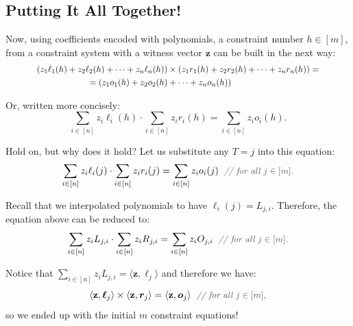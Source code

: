 \documentclass[../../book.tex]{subfiles}
\begin{document}
\subsection{Putting It All Together!}

Now, using coefficients encoded with polynomials, a constraint number $h \in
[m]$, from a constraint system with a witness vector $\mathbf{z}$ can be built
in the next way:
\begin{equation*} 
    \scalebox{0.9}{$
    \begin{aligned}
        (z_1\ell_1(h) + z_2\ell_2(h) + \dots + z_n\ell_n(h)) &\times (z_1r_1(h) + z_2r_2(h) + \dots + z_nr_n(h)) =\\ = (z_1o_1(h) + z_2o_2(h)& + \dots + z_no_n(h))
    \end{aligned}
    $}
\end{equation*}

Or, written more concisely:
\begin{equation*}
    \sum_{i \in [n]} z_i\ell_i(h) \cdot \sum_{i \in [n]} z_ir_i(h) = \sum_{i \in [n]} z_io_i(h).
\end{equation*}

\begin{remark}
    Hold on, but why does it hold? Let us substitute any $T=j$ into this equation:
    \begin{equation*}
        \sum_{i \in [n]} z_i\ell_i(j) \cdot \sum_{i \in [n]} z_ir_i(j) = \sum_{i \in [n]} z_io_i(j) \; \commentgray{for all $j \in [m]$.}
    \end{equation*}

    Recall that we interpolated polynomials to have $\ell_i(j) = L_{j,i}$.
    Therefore, the equation above can be reduced to:
    \begin{equation*}
        \sum_{i \in [n]} z_iL_{j,i} \cdot \sum_{i \in [n]} z_iR_{j,i} = \sum_{i \in [n]} z_iO_{j,i} \; \commentgray{for all $j \in [m]$.}
    \end{equation*}

    Notice that $\sum_{i \in [n]} z_iL_{j,i} = \langle \mathbf{z}, \boldsymbol{\ell}_j \rangle$ and therefore we have:
    \begin{equation*}
        \langle \mathbf{z}, \boldsymbol{\ell}_j \rangle \times \langle \mathbf{z}, \boldsymbol{r}_j \rangle = \langle \mathbf{z}, \boldsymbol{o}_j \rangle \; \commentgray{for all $j \in [m]$,}
    \end{equation*}
    so we ended up with the initial $m$ constraint equations!
\end{remark}
\end{document}
